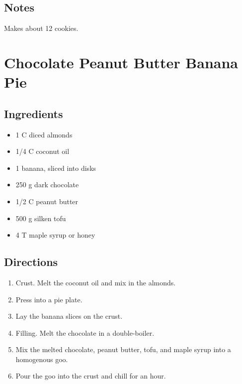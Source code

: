 \documentclass[letterpaper,10pt,english]{sphinxmanual}
\begin{document}
\section{Notes}
\label{chocolate_chip_cookies:notes}
Makes about 12 cookies.


\chapter{Chocolate Peanut Butter Banana Pie}
\label{cpbb_pie:chocolate-peanut-butter-banana-pie}\label{cpbb_pie::doc}

\section{Ingredients}
\label{cpbb_pie:ingredients}\begin{itemize}
\item {} 
1   C   diced almonds

\item {} 
1/4     C   coconut oil

\item {} 
1       banana, sliced into disks

\item {} 
250     g   dark chocolate

\item {} 
1/2     C   peanut butter

\item {} 
500     g   silken tofu

\item {} 
4       T   maple syrup or honey

\end{itemize}


\section{Directions}
\label{cpbb_pie:directions}\begin{enumerate}
\item {} 
Crust.  Melt the coconut oil and mix in the almonds.

\item {} 
Press into a pie plate.

\item {} 
Lay the banana slices on the crust.

\item {} 
Filling.  Melt the chocolate in a double-boiler.

\item {} 
Mix the melted chocolate, peanut butter, tofu, and maple syrup into a homogenous goo.

\item {} 
Pour the goo into the crust and chill for an hour.

\end{enumerate}
\end{document}
